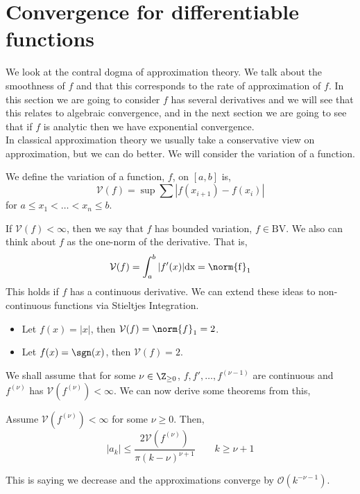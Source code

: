 
\section{Convergence for differentiable functions}
We look at the contral dogma of approximation theory. We talk about the smoothness of $f$ and that this corresponds to the rate of approximation of $f$. In this section we are going to consider $f$ has several derivatives and we will see that this relates to algebraic convergence, and in the next section we are going to see that if $f$ is analytic then we have exponential convergence.\\

\noindent
In classical approximation theory we usually take a conservative view on approximation, but we can do better. We will consider the variation of a function.
\begin{ndefi}[Variation]
  We define the variation of a function, $f$, on $[a, b]$ is,
  $$ \mathcal{V}(f) = \sup \sum |f(x_{i+1}) - f(x_i)| $$
  for $a \le x_1 < \dots < x_n \le b$.
\end{ndefi}

\noindent
If $\mathcal{V}(f) < \infty$, then we say that $f$ has bounded variation, $f \in \mathrm{BV}$. We also can think about $f$ as the one-norm of the derivative. That is,
$$ \mathcal{V}(f) = \int_a^b |f'(x)|\rm dx = \norm{f}_1$$
This holds if $f$ has a continuous derivative. We can extend these ideas to non-continuous functions via Stieltjes Integration.
\begin{eg}
  \begin{itemize}
    \item Let $f(x) = |x|$, then $\mathcal{V}(f) = \norm{f}_1 = 2$.
    \item Let $f(x) = \sgn(x)$, then $\mathcal{V}(f) = 2$.
  \end{itemize}
\end{eg}

\noindent
We shall assume that for some $\nu \in \Z_{\ge 0}$, $f, f', \dots, f^{(\nu - 1)}$ are continuous and $f^{(\nu)}$ has $\mathcal{V}(f^{(\nu)}) < \infty$. We can now derive some theorems from this,
\begin{nthm}
  Assume $\mathcal{V}(f^{(\nu)}) < \infty$ for some $\nu \ge 0$. Then,
  $$ |a_k| \le \frac{2\mathcal{V}(f^{(\nu)})}{\pi(k - \nu)^{\nu + 1}} \qquad k \ge \nu + 1$$
\end{nthm}
\noindent
This is saying we decrease and the approximations converge by $\mathcal{O}(k^{-\nu-1})$.\\

